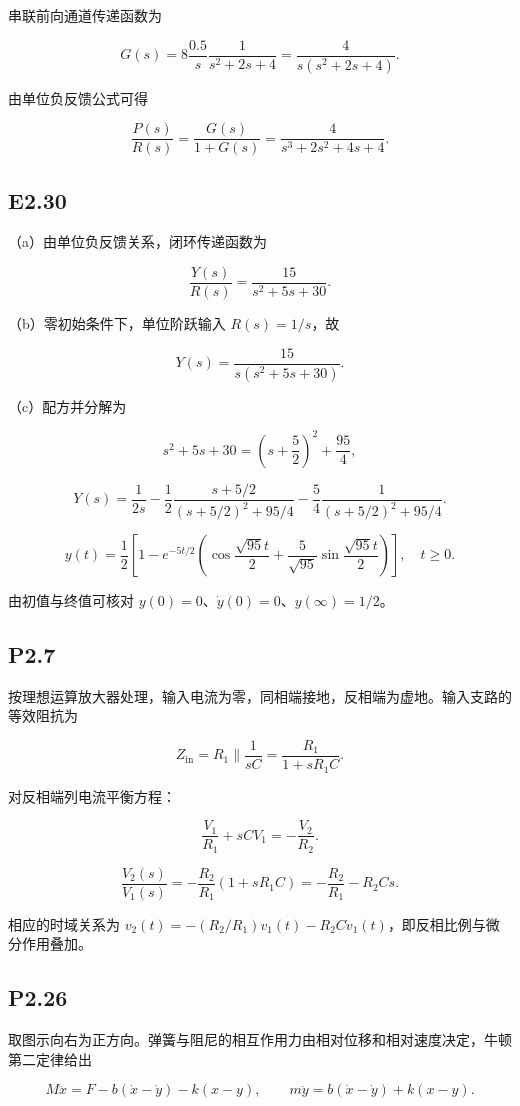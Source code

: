 \documentclass[UTF8,12pt]{ctexart}
\begin{document}
串联前向通道传递函数为

\[
G(s)=8\frac{0.5}{s}\frac1{s^2+2s+4}=\frac4{s(s^2+2s+4)}.
\]

由单位负反馈公式可得

\[
\boxed{\frac{P(s)}{R(s)}=\frac{G(s)}{1+G(s)}=\frac4{s^3+2s^2+4s+4}}.
\]


\subsection*{E2.30}
（a）由单位负反馈关系，闭环传递函数为

\[
\boxed{\frac{Y(s)}{R(s)}=\frac{15}{s^2+5s+30}}.
\]

（b）零初始条件下，单位阶跃输入 $R(s)=1/s$，故

\[
\boxed{Y(s)=\frac{15}{s(s^2+5s+30)}}.
\]

（c）配方并分解为

\[
s^2+5s+30=\left(s+\frac52\right)^2+\frac{95}{4},
\]

\[
Y(s)=\frac1{2s}-\frac12\frac{s+5/2}{(s+5/2)^2+95/4}-\frac54\frac1{(s+5/2)^2+95/4}.
\]

\[
\boxed{y(t)=\frac12\left[1-e^{-5t/2}\left(\cos\frac{\sqrt{95}t}{2}+\frac5{\sqrt{95}}\sin\frac{\sqrt{95}t}{2}\right)\right],\quad t\ge0.}
\]

由初值与终值可核对 $y(0)=0$、$\dot y(0)=0$、$y(\infty)=1/2$。


\subsection*{P2.7}
按理想运算放大器处理，输入电流为零，同相端接地，反相端为虚地。输入支路的等效阻抗为

\[
Z_{\mathrm{in}}=R_1\parallel\frac1{sC}=\frac{R_1}{1+sR_1C}.
\]

对反相端列电流平衡方程：

\[
\frac{V_1}{R_1}+sCV_1=-\frac{V_2}{R_2}.
\]

\[
\boxed{\frac{V_2(s)}{V_1(s)}=-\frac{R_2}{R_1}(1+sR_1C)=-\frac{R_2}{R_1}-R_2Cs.}
\]

相应的时域关系为 $v_2(t)=-(R_2/R_1)v_1(t)-R_2C\dot v_1(t)$，即反相比例与微分作用叠加。


\subsection*{P2.26}
取图示向右为正方向。弹簧与阻尼的相互作用力由相对位移和相对速度决定，牛顿第二定律给出

\[
M\ddot x=F-b(\dot x-\dot y)-k(x-y),\qquad m\ddot y=b(\dot x-\dot y)+k(x-y).
\]
\end{document}
